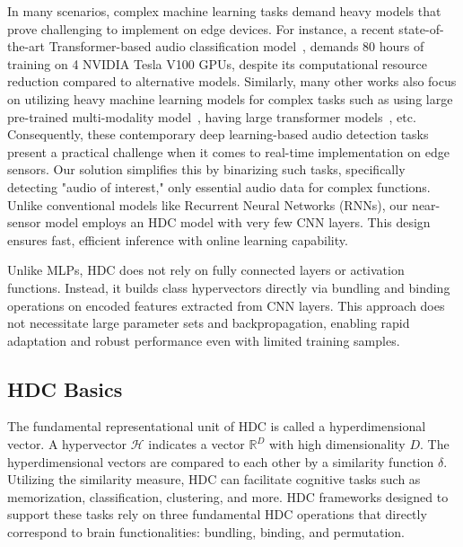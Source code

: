 

In many scenarios, complex machine learning tasks demand heavy models that prove challenging to implement on edge devices. For instance, a recent state-of-the-art Transformer-based audio classification model~\cite{9746312}, demands 80 hours of training on 4 NVIDIA Tesla V100 GPUs, despite its computational resource reduction compared to alternative models. Similarly, many other works also focus on utilizing heavy machine learning models for complex tasks such as using large pre-trained multi-modality model~\cite{wu2022wav2clip}, having large transformer models~\cite{baade2022mae}, etc. Consequently, these contemporary deep learning-based audio detection tasks present a practical challenge when it comes to real-time implementation on edge sensors. Our solution simplifies this by binarizing such tasks, specifically detecting "audio of interest," only essential audio data for complex functions. Unlike conventional models like Recurrent Neural Networks (RNNs), our near-sensor model employs an HDC model with very few CNN layers. This design ensures fast, efficient inference with online learning capability.

Unlike MLPs, HDC does not rely on fully connected layers or activation functions. Instead, it builds class hypervectors directly via bundling and binding operations on encoded features extracted from CNN layers. This approach does not necessitate large parameter sets and backpropagation, enabling rapid adaptation and robust performance even with limited training samples.


\subsection{HDC Basics}
The fundamental representational unit of HDC is called a hyperdimensional vector. A hypervector $\mathcal{H}$ indicates a vector $\mathbb{R}^D$ with high dimensionality $D$. The hyperdimensional vectors are compared to each other by a similarity function $\delta$. Utilizing the similarity measure, HDC can facilitate cognitive tasks such as memorization, classification, clustering, and more. HDC frameworks designed to support these tasks rely on three fundamental HDC operations that directly correspond to brain functionalities: bundling, binding, and permutation.

